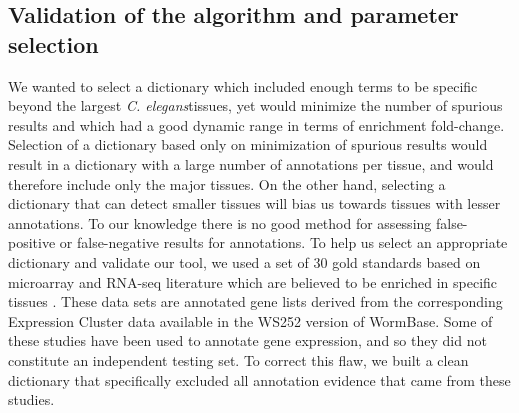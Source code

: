 \documentclass{bmcart}
\begin{document}
\subsection*{Validation of the algorithm and parameter selection}
	We wanted to select a dictionary which included enough terms to be specific beyond the largest  \emph{C. elegans}tissues, yet would minimize the number of spurious results and which had a good dynamic range in terms of enrichment fold-change. Selection of a dictionary based only on minimization of spurious results would result in a dictionary with a large number of annotations per tissue, and would therefore include only the major tissues. On the other hand, selecting a dictionary that can detect smaller tissues will bias us towards tissues with lesser annotations. To our knowledge there is no good method for assessing false-positive or false-negative results for annotations.
	To help us select an appropriate dictionary and validate our tool, we used a set of 30 gold standards based on microarray and RNA-seq literature which are believed to be enriched in specific tissues \cite{Gaudet2004a, Spencer2011, Cinar2005, Watson2008a, Pauli2006, Portman2004, Fox2007, Smith2010}. These data sets are annotated gene lists derived from the corresponding Expression Cluster data available in the WS252 version of WormBase. Some of these studies have been used to annotate gene expression, and so they did not constitute an independent testing set. To correct this flaw, we built a clean dictionary that specifically excluded all annotation evidence that came from these studies.
\end{document}
